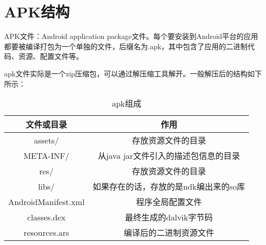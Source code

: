 \section{APK结构}
APK文件：Android application package文件。每个要安装到Android平台的应用都要被编译打包为一个单独的文件，后缀名为.apk，其中包含了应用的二进制代码、资源、配置文件等。

apk文件实际是一个zip压缩包，可以通过解压缩工具解开。一般解压后的结构如下所示：
\begin{table}[htbp]
\centering
\caption{\label{apk}apk组成}
\begin{tabular}{|c|c|}
\hline
文件或目录 & 作用\\
\hline
assets/ & 存放资源文件的目录\\
\hline
META-INF/ & 从java jar文件引入的描述包信息的目录\\
\hline
res/ & 存放资源文件的目录\\
\hline
libs/ & 如果存在的话，存放的是ndk编出来的so库\\
\hline
AndroidManifest.xml & 程序全局配置文件\\
\hline
classes.dex & 最终生成的dalvik字节码\\
\hline
resources.ars & 编译后的二进制资源文件\\
\hline
\end{tabular}
\end{table}

